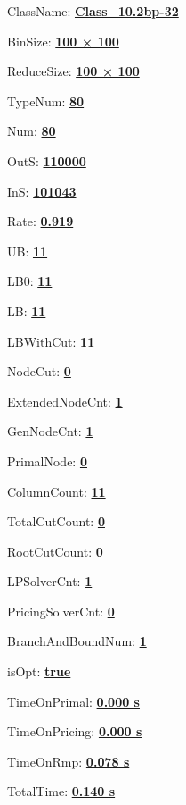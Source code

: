 \documentclass[11pt]{article}
\begin{document}
\pagestyle{empty}


ClassName: \underline{\textbf{Class_10.2bp-32}}
\par
BinSize: \underline{\textbf{100 × 100}}
\par
ReduceSize: \underline{\textbf{100 × 100}}
\par
TypeNum: \underline{\textbf{80}}
\par
Num: \underline{\textbf{80}}
\par
OutS: \underline{\textbf{110000}}
\par
InS: \underline{\textbf{101043}}
\par
Rate: \underline{\textbf{0.919}}
\par
UB: \underline{\textbf{11}}
\par
LB0: \underline{\textbf{11}}
\par
LB: \underline{\textbf{11}}
\par
LBWithCut: \underline{\textbf{11}}
\par
NodeCut: \underline{\textbf{0}}
\par
ExtendedNodeCnt: \underline{\textbf{1}}
\par
GenNodeCnt: \underline{\textbf{1}}
\par
PrimalNode: \underline{\textbf{0}}
\par
ColumnCount: \underline{\textbf{11}}
\par
TotalCutCount: \underline{\textbf{0}}
\par
RootCutCount: \underline{\textbf{0}}
\par
LPSolverCnt: \underline{\textbf{1}}
\par
PricingSolverCnt: \underline{\textbf{0}}
\par
BranchAndBoundNum: \underline{\textbf{1}}
\par
isOpt: \underline{\textbf{true}}
\par
TimeOnPrimal: \underline{\textbf{0.000 s}}
\par
TimeOnPricing: \underline{\textbf{0.000 s}}
\par
TimeOnRmp: \underline{\textbf{0.078 s}}
\par
TotalTime: \underline{\textbf{0.140 s}}
\par
\newpage


\end{document}
